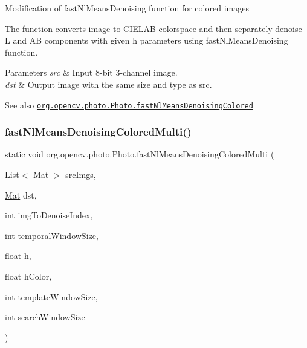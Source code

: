 Modification of {\ttfamily fast\+Nl\+Means\+Denoising} function for colored images

The function converts image to C\+I\+E\+L\+AB colorspace and then separately denoise L and AB components with given h parameters using {\ttfamily fast\+Nl\+Means\+Denoising} function.


\begin{DoxyParams}{Parameters}
{\em src} & Input 8-\/bit 3-\/channel image. \\
\hline
{\em dst} & Output image with the same size and type as {\ttfamily src}.\\
\hline
\end{DoxyParams}
\begin{DoxySeeAlso}{See also}
\href{http://docs.opencv.org/modules/photo/doc/denoising.html#fastnlmeansdenoisingcolored}{\tt org.\+opencv.\+photo.\+Photo.\+fast\+Nl\+Means\+Denoising\+Colored} 
\end{DoxySeeAlso}
\mbox{\label{classorg_1_1opencv_1_1photo_1_1_photo_a8880d07c3acf6bebf7ed92d4a453e4e2}} 
\subsubsection{\texorpdfstring{fast\+Nl\+Means\+Denoising\+Colored\+Multi()}{fastNlMeansDenoisingColoredMulti()}\hspace{0.1cm}{\footnotesize\ttfamily [1/2]}}
{\footnotesize\ttfamily static void org.\+opencv.\+photo.\+Photo.\+fast\+Nl\+Means\+Denoising\+Colored\+Multi (\begin{DoxyParamCaption}\item[{List$<$ \mbox{\hyperlink{classorg_1_1opencv_1_1core_1_1_mat}{Mat}} $>$}]{src\+Imgs,  }\item[{\mbox{\hyperlink{classorg_1_1opencv_1_1core_1_1_mat}{Mat}}}]{dst,  }\item[{int}]{img\+To\+Denoise\+Index,  }\item[{int}]{temporal\+Window\+Size,  }\item[{float}]{h,  }\item[{float}]{h\+Color,  }\item[{int}]{template\+Window\+Size,  }\item[{int}]{search\+Window\+Size }\end{DoxyParamCaption})\hspace{0.3cm}{\ttfamily [static]}}

